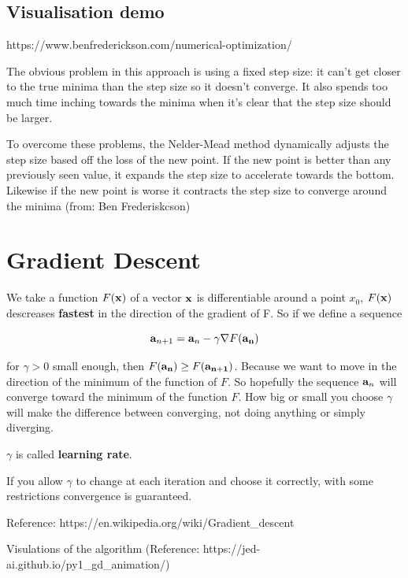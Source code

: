 \documentclass[11pt]{article}
\begin{document}
    \subsection{Visualisation demo}\label{visualisation-demo}

https://www.benfrederickson.com/numerical-optimization/

    The obvious problem in this approach is using a fixed step size: it
can't get closer to the true minima than the step size so it doesn't
converge. It also spends too much time inching towards the minima when
it's clear that the step size should be larger.

To overcome these problems, the Nelder-Mead method dynamically adjusts
the step size based off the loss of the new point. If the new point is
better than any previously seen value, it expands the step size to
accelerate towards the bottom. Likewise if the new point is worse it
contracts the step size to converge around the minima (from: Ben
Frederiskcson)

    \section{Gradient Descent}\label{gradient-descent}

    We take a function \(F({\bf x})\) of a vector \(\bf x\) is
differentiable around a point \(x_0\), \(F({\bf x})\) descreases
\textbf{fastest} in the direction of the gradient of F. So if we define
a sequence

\[
{\bf a}_{n+1} = {\bf a}_n - \gamma \nabla F({\bf a_n})
\]

for \(\gamma > 0\) small enough, then
\(F({\bf a_n}) \geq F({\bf a_{n+1}})\). Because we want to move in the
direction of the minimum of the function of \(F\). So hopefully the
sequence \({\bf a}_n\) will converge toward the minimum of the function
\(F\). How big or small you choose \(\gamma\) will make the difference
between converging, not doing anything or simply diverging.

\(\gamma\) is called \textbf{learning rate}.

If you allow \(\gamma\) to change at each iteration and choose it
correctly, with some restrictions convergence is guaranteed.

Reference: https://en.wikipedia.org/wiki/Gradient\_descent

    Visulations of the algorithm (Reference:
https://jed-ai.github.io/py1\_gd\_animation/)
\end{document}
